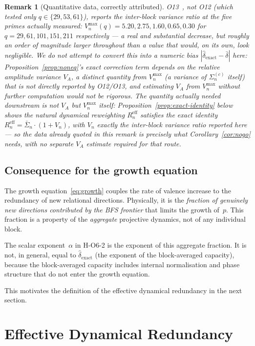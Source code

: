 \documentclass[11pt,a4paper]{article}
\newtheorem{remark}[theorem]{Remark}
\newcommand{\Sn}{\bar{\Sigma}_n}
\newcommand{\dexact}{\hat{\delta}_{\mathrm{exact}}}
\newcommand{\Reff}{R_n^{\mathrm{eff}}}
\begin{document}
\begin{remark}[Quantitative data, correctly attributed]
\label{rem:quantitative}
O13~\cite{Beau2026a17}, not O12 (which tested only $q\in\{29,53,61\}$),
reports the inter-block variance ratio at the five primes actually measured:
$V_n^{\max}(q) = 5.20, 2.75, 1.60, 0.65, 0.30$ for
$q = 29, 61, 101, 151, 211$ respectively — a real and substantial decrease,
but roughly an order of magnitude larger throughout than a value that would,
on its own, look negligible.
We do not attempt to convert this into a numeric bias
$|\dexact-\bar\delta|$ here: Proposition~\ref{prop:noneq}'s exact correction
term depends on the relative \emph{amplitude} variance $V_A$, a distinct
quantity from $V_n^{\max}$ (a variance of $\Sigma_n^{(c)}$ itself) that is
not directly reported by O12/O13, and estimating $V_A$ from $V_n^{\max}$
without further computation would not be rigorous.
The quantity actually needed downstream is not $V_A$ but $V_n^{\max}$ itself:
Proposition~\ref{prop:exact-identity} below shows the natural dynamical
reweighting $\Reff$ satisfies the exact identity $\Reff=\Sn\cdot(1+V_n)$,
with $V_n$ exactly the inter-block variance ratio reported here — so the
data already quoted in this remark is precisely what Corollary~\ref{cor:nogo}
needs, with no separate $V_A$ estimate required for that route.
\end{remark}

\subsection{Consequence for the growth equation}

The growth equation~\eqref{eq:growth} couples the rate of valence
increase to the redundancy of new relational directions.
Physically, it is the \emph{fraction of genuinely new directions
contributed by the BFS frontier} that limits the growth of~$p$.
This fraction is a property of the \emph{aggregate} projective
dynamics, not of any individual block.

The scalar exponent~$\alpha$ in H-O6-2 is the exponent of this
aggregate fraction.
It is not, in general, equal to $\dexact$ (the exponent of the
block-averaged capacity), because the block-averaged capacity
includes internal normalisation and phase structure that do not
enter the growth equation.

This motivates the definition of the effective dynamical redundancy
in the next section.

\section{Effective Dynamical Redundancy}
\label{sec:Reff}
\end{document}

